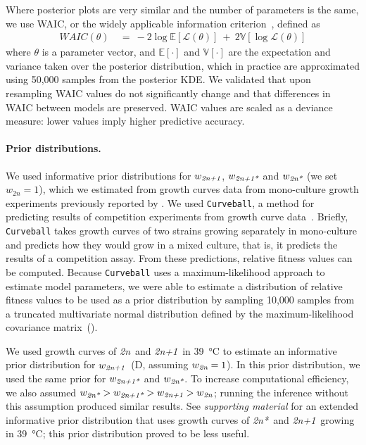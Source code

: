 \documentclass[12pt]{extarticle}
\newcommand{\likelihood}{\mathcal{L}}
\newcommand{\euwt}{\emph{2n}}
\newcommand{\anwt}{\emph{2n+1}}
\newcommand{\eumt}{\emph{2n*}}
\newcommand{\anmt}{\emph{2n+1*}}
\begin{document}
Where posterior plots are very similar and the number of parameters is the same, we use WAIC, or the widely applicable information criterion~\citep{gelman2013bayesian}, defined as
\begin{equation} \label{eq:WAIC}
\begin{aligned}
\mathit{WAIC}(\theta) &\ =\ 
-2\log\mathbb{E}[\likelihood(\theta)]\ +\ 2\mathbb{V}[\log\likelihood(\theta)]
\end{aligned}
\end{equation}
where $\theta$ is a parameter vector, and $\mathbb{E}[\cdot]$ and $\mathbb{V}[\cdot]$ are the expectation and variance taken over the posterior distribution, which in practice are approximated using 50,000 samples from the posterior KDE. We validated that upon resampling WAIC values do not significantly change and that differences in WAIC between models are preserved.
WAIC values are scaled as a deviance measure: lower values imply higher predictive accuracy.
 
\paragraph{Prior distributions.} \label{par:prior}
We used informative prior distributions for $w_{\anwt}$, $w_{\anmt}$ and $w_{\eumt}$ (we set $w_{2n}=1$), which we estimated from growth curves data from mono-culture growth experiments previously reported by \citet[Figs. 3C, 4A, and S2]{Yona2012}.
We used \texttt{Curveball}, a method for predicting results of competition experiments from growth curve data~\citep[\href{https://curveball.yoavram.com}{curveball.yoavram.com}]{Ram2019}. Briefly, \texttt{Curveball} takes growth curves of two strains growing separately in mono-culture and predicts how they would grow in a mixed culture, that is, it predicts the results of a competition assay.
From these predictions, relative fitness values can be computed. Because \texttt{Curveball} uses a maximum-likelihood approach to estimate model parameters, we were able to estimate a distribution of relative fitness values to be used as a prior distribution by sampling 10,000 samples from a truncated multivariate normal distribution defined by the maximum-likelihood covariance matrix~().

We used growth curves of \euwt\ and \anwt\ in \SI{39}{\celsius} to estimate an informative prior distribution for $w_{\anwt}$~(D, assuming $w_{\euwt}=1$).
In this prior distribution, we used the same prior for $w_{\anmt}$ and $w_{\eumt}$. 
To increase computational efficiency, we also assumed $w_\eumt>w_\anmt>w_\anwt>w_\euwt$; running the inference without this assumption produced similar results.
See \emph{supporting material} for an extended informative prior distribution that uses growth curves of \eumt\ and \anwt\ growing in \SI{39}{\celsius}; this prior distribution proved to be less useful.
\end{document}
